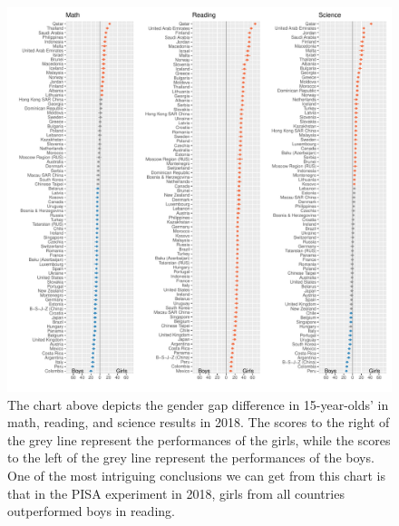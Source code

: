 \begin{Schunk}
\begin{figure}[H]
\includegraphics[width=1\linewidth]{learningtower_files/figure-latex/score-differences-1} \caption[The chart above depicts the gender gap difference in 15-year-olds' in math, reading, and science results in 2018]{The chart above depicts the gender gap difference in 15-year-olds' in math, reading, and science results in 2018. The scores to the right of the grey line represent the performances of the girls, while the scores to the left of the grey line represent the performances of the boys. One of the most intriguing conclusions we can get from this chart is that in the PISA experiment in 2018, girls from all countries outperformed boys in reading.}\label{fig:score-differences}
\end{figure}
\end{Schunk}

